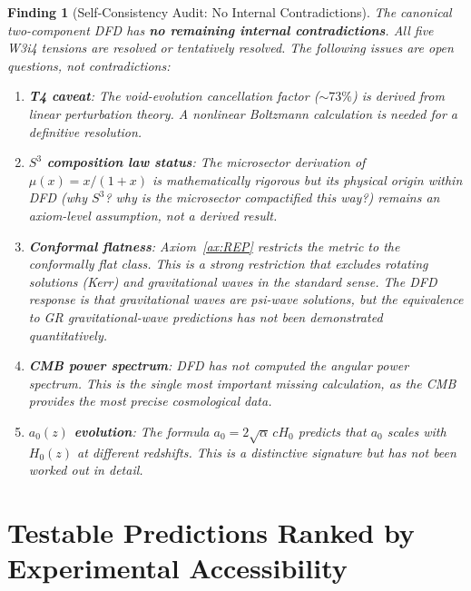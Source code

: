 \documentclass[11pt]{article}
\newtheorem{finding}{Finding}
\newcommand{\aM}{a_0}
\newcommand{\Hzero}{H_0}
\newcommand{\mufd}{\mu}
\begin{document}
\begin{finding}[Self-Consistency Audit: No Internal Contradictions]
\label{find:no-contradictions}
The canonical two-component DFD has \textbf{no remaining internal
contradictions}. All five W3i4 tensions are resolved or tentatively
resolved. The following issues are \emph{open questions}, not
contradictions:

\begin{enumerate}
\item \textbf{T4 caveat}: The void-evolution cancellation factor
  ($\sim 73\%$) is derived from linear perturbation theory. A
  nonlinear Boltzmann calculation is needed for a definitive
  resolution.

\item \textbf{$S^3$ composition law status}: The microsector
  derivation of $\mufd(x) = x/(1+x)$ is mathematically rigorous
  but its \emph{physical} origin within DFD (why $S^3$? why is the
  microsector compactified this way?) remains an axiom-level
  assumption, not a derived result.

\item \textbf{Conformal flatness}: Axiom~\ref{ax:REP} restricts
  the metric to the conformally flat class. This is a strong
  restriction that excludes rotating solutions (Kerr) and
  gravitational waves in the standard sense. The DFD response is
  that gravitational waves are psi-wave solutions, but the
  equivalence to GR gravitational-wave predictions has not been
  demonstrated quantitatively.

\item \textbf{CMB power spectrum}: DFD has not computed the angular
  power spectrum. This is the single most important missing
  calculation, as the CMB provides the most precise cosmological
  data.

\item \textbf{$\aM(z)$ evolution}: The formula $\aM = 2\sqrt{\alpha}\,c\Hzero$
  predicts that $\aM$ scales with $\Hzero(z)$ at different redshifts.
  This is a distinctive signature but has not been worked out in
  detail.
\end{enumerate}
\end{finding}


\newpage
\part{Testable Predictions Ranked by Experimental Accessibility}
\label{part:ranked}
\end{document}
